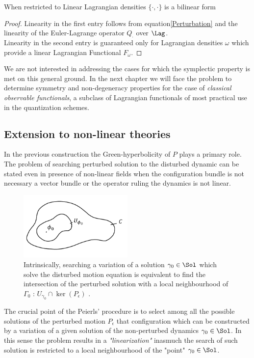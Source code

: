 \documentclass[Main]{subfiles}
\begin{document}
		\begin{proposition}[Bilinearity]
			When restricted to Linear Lagrangian densities $\{\cdot,\cdot\}$ is a bilinear form
		\end{proposition}
		\begin{proof}
			Linearity in the first entry follows from equation\ref{Perturbation} and the linearity of the Euler-Lagrange operator $Q_\cdot$ over $\Lag$.
			\\
			Linearity in the second entry is guaranteed only for Lagrangian densities $\omega$ which provide a linear Lagrangian Functional $F_\omega$.
		\end{proof}
		We are not interested in addressing the cases for which the symplectic property is met on this general ground. 
		In the next chapter we will face the problem to determine  symmetry and non-degeneracy properties for the case of  \emph{classical observable functionals}, a subclass of Lagrangian functionals of most practical use in the quantization schemes.

	\subsection{Extension to non-linear theories}\label{Section:NonLinearPeierls}
		In the previous construction the Green-hyperbolicity of $P$ plays a primary role.
		The problem of searching perturbed solution to the disturbed dynamic can be stated even in presence  of non-linear fields  when the configuration bundle is not necessary a vector bundle or the operator ruling the dynamics is not linear.
		\begin{figure}[h!]
				  \centering
			   	\includegraphics[width=0.5\textwidth]{Pictures/Linearization} 
   	  			\caption{Intrinsically, searching a variation of a solution $\gamma_0\in \Sol$ which solve the disturbed motion equation is equivalent to find the intersection of the perturbed solution with a local neighbourhood of $\Gamma_0$ : $U_{\gamma_0}\cap\ker(P_\epsilon)$ .}
		\end{figure}		
		
		The crucial point of the Peierls' procedure  is to select among all the possible solutions of the perturbed motion $P_\epsilon$ that configuration which can be constructed by a variation of a given solution of the non-perturbed dynamics $\gamma_0 \in \Sol$.
		In this sense the problem results in a \emph{"linearization"} inasmuch the  search of such solution is restricted to a local neighbourhood of the "point" $\gamma_0\in \Sol$.
\end{document}
